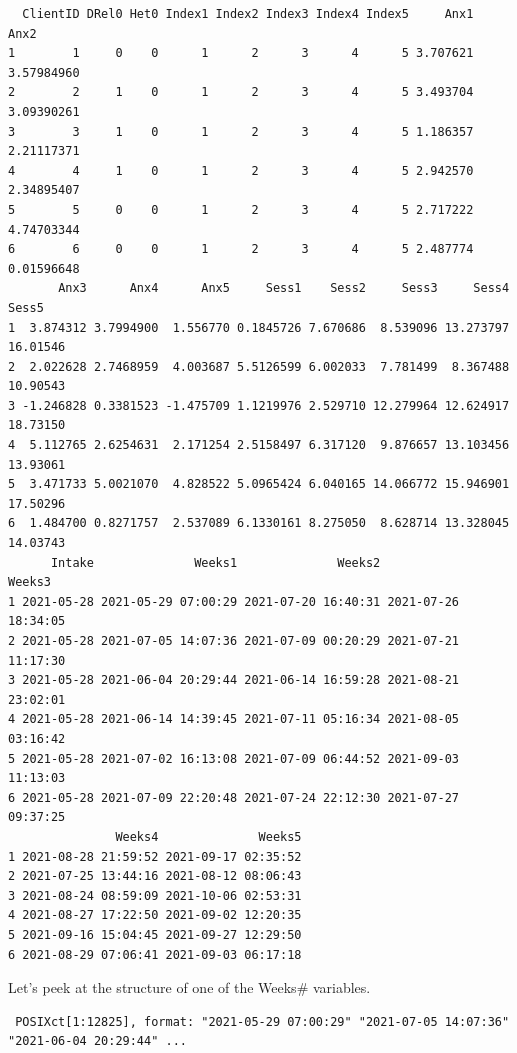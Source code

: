 \documentclass[
  11pt,
]{book}
\newenvironment{Shaded}{\begin{snugshade}}{\end{snugshade}}
\newcommand{\FunctionTok}[1]{\textcolor[rgb]{0.00,0.00,0.00}{#1}}
\newcommand{\NormalTok}[1]{#1}
\newcommand{\SpecialCharTok}[1]{\textcolor[rgb]{0.00,0.00,0.00}{#1}}
\begin{document}
\begin{verbatim}
  ClientID DRel0 Het0 Index1 Index2 Index3 Index4 Index5     Anx1       Anx2
1        1     0    0      1      2      3      4      5 3.707621 3.57984960
2        2     1    0      1      2      3      4      5 3.493704 3.09390261
3        3     1    0      1      2      3      4      5 1.186357 2.21117371
4        4     1    0      1      2      3      4      5 2.942570 2.34895407
5        5     0    0      1      2      3      4      5 2.717222 4.74703344
6        6     0    0      1      2      3      4      5 2.487774 0.01596648
       Anx3      Anx4      Anx5     Sess1    Sess2     Sess3     Sess4    Sess5
1  3.874312 3.7994900  1.556770 0.1845726 7.670686  8.539096 13.273797 16.01546
2  2.022628 2.7468959  4.003687 5.5126599 6.002033  7.781499  8.367488 10.90543
3 -1.246828 0.3381523 -1.475709 1.1219976 2.529710 12.279964 12.624917 18.73150
4  5.112765 2.6254631  2.171254 2.5158497 6.317120  9.876657 13.103456 13.93061
5  3.471733 5.0021070  4.828522 5.0965424 6.040165 14.066772 15.946901 17.50296
6  1.484700 0.8271757  2.537089 6.1330161 8.275050  8.628714 13.328045 14.03743
      Intake              Weeks1              Weeks2              Weeks3
1 2021-05-28 2021-05-29 07:00:29 2021-07-20 16:40:31 2021-07-26 18:34:05
2 2021-05-28 2021-07-05 14:07:36 2021-07-09 00:20:29 2021-07-21 11:17:30
3 2021-05-28 2021-06-04 20:29:44 2021-06-14 16:59:28 2021-08-21 23:02:01
4 2021-05-28 2021-06-14 14:39:45 2021-07-11 05:16:34 2021-08-05 03:16:42
5 2021-05-28 2021-07-02 16:13:08 2021-07-09 06:44:52 2021-09-03 11:13:03
6 2021-05-28 2021-07-09 22:20:48 2021-07-24 22:12:30 2021-07-27 09:37:25
               Weeks4              Weeks5
1 2021-08-28 21:59:52 2021-09-17 02:35:52
2 2021-07-25 13:44:16 2021-08-12 08:06:43
3 2021-08-24 08:59:09 2021-10-06 02:53:31
4 2021-08-27 17:22:50 2021-09-02 12:20:35
5 2021-09-16 15:04:45 2021-09-27 12:29:50
6 2021-08-29 07:06:41 2021-09-03 06:17:18
\end{verbatim}

Let's peek at the structure of one of the Weeks\# variables.

\begin{Shaded}
\end{Shaded}

\begin{verbatim}
 POSIXct[1:12825], format: "2021-05-29 07:00:29" "2021-07-05 14:07:36" "2021-06-04 20:29:44" ...
\end{verbatim}
\end{document}
